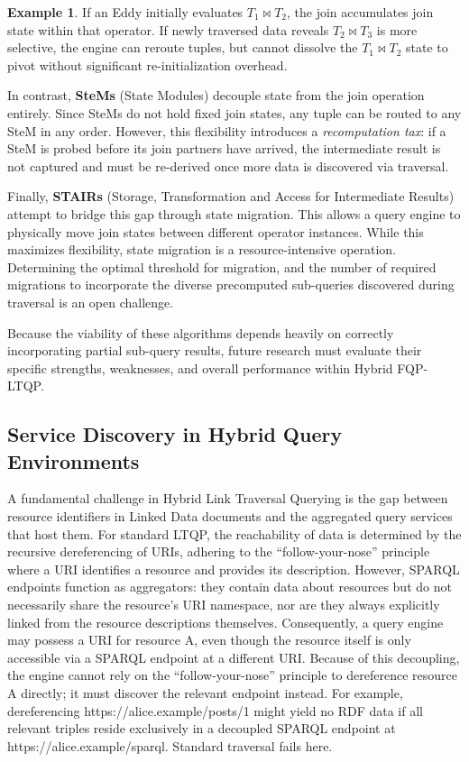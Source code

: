 \documentclass{ceurart}
\theoremstyle{definition}
\newtheorem{exmp}{Example}[section]
\begin{document}
\begin{exmp}
If an Eddy initially evaluates $T_1 \bowtie T_2$, 
the join accumulates join state within that operator. 
If newly traversed data reveals $T_2 \bowtie T_3$ is more selective,
the engine can reroute tuples, but cannot dissolve the $T_1 \bowtie T_2$ state
to pivot without significant re-initialization overhead.
\end{exmp}

In contrast, \textbf{SteMs} (State Modules) decouple state from the join operation entirely. 
Since SteMs do not hold fixed join states, any tuple can be routed to any SteM in any order. 
However, this flexibility introduces a \textit{recomputation tax}: if a SteM is probed before its join partners have arrived,
the intermediate result is not captured and must be re-derived once more data is discovered via traversal.

Finally, \textbf{STAIRs} (Storage, Transformation and Access for Intermediate Results) attempt to bridge this gap through state migration. 
This allows a query engine to physically move join states between different operator instances. 
While this maximizes flexibility, state migration is a resource-intensive operation. 
Determining the optimal threshold for migration, and the number of required migrations to incorporate the diverse precomputed sub-queries discovered
during traversal is an open challenge.

Because the viability of these algorithms depends heavily on correctly incorporating partial sub-query results,
future research must evaluate their specific strengths, weaknesses, and overall performance within Hybrid FQP-LTQP.

\subsection{Service Discovery in Hybrid Query Environments}

A fundamental challenge in Hybrid Link Traversal Querying is the gap between resource identifiers in Linked Data documents and the aggregated query services that host them.
For standard LTQP, the reachability of data is determined by the recursive dereferencing of URIs, 
adhering to the ``follow-your-nose'' principle where a URI identifies a resource and provides its description.
However, SPARQL endpoints function as aggregators: they contain data about resources but do not necessarily share the resource's URI namespace,
nor are they always explicitly linked from the resource descriptions themselves.
Consequently, a query engine may possess a URI for resource A,
even though the resource itself is only accessible via a SPARQL endpoint at a different URI\@. 
Because of this decoupling, the engine cannot rely on the ``follow-your-nose'' principle to dereference resource A directly; 
it must discover the relevant endpoint instead.
For example, dereferencing https://alice.example/posts/1 might yield no RDF data if 
all relevant triples reside exclusively in a decoupled SPARQL endpoint at https://alice.example/sparql. 
Standard traversal fails here.
\end{document}
